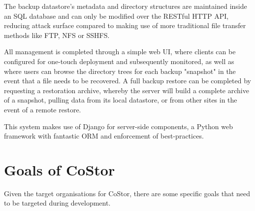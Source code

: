\documentclass[bsc,frontabs,twoside,singlespacing,parskip,deptreport]{infthesis}     %
\begin{document}
The backup datastore's metadata and directory structures are maintained inside an SQL
database and can only be modified over the RESTful HTTP API, reducing attack surface
compared to making use of more traditional file transfer methods like FTP, NFS or 
SSHFS.

All management is completed through a simple web UI, where clients can be configured 
for one-touch deployment and subsequently monitored, as well as where users can browse
the directory trees for each backup "snapshot" in the event that a file needs to be
recovered. A full backup restore can be completed by requesting a restoration archive,
whereby the server will build a complete archive of a snapshot, pulling data from its
local datastore, or from other sites in the event of a remote restore.

This system makes use of Django for server-side components, a Python web framework with
fantastic ORM and enforcement of best-practices.

\clearpage

\section{Goals of CoStor}

Given the target organisations for CoStor, there are some specific goals that need to be 
targeted during development.
\end{document}
